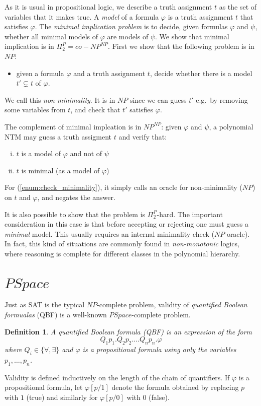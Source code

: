\documentclass{report}
\newcommand{\NP}{\text{$\mathit{NP}$}\xspace}
\newcommand{\Po}{\text{$\mathit{P}$}\xspace}
\newtheorem{definition}{Definition}[chapter]
\begin{document}
As it is usual in propositional logic, we describe a truth assignment $t$ as the set of variables that it makes true. A \emph{model} of a formula $\varphi$ is a truth assignment $t$ that satisfies $\varphi$. The \emph{minimal implication problem} is to decide, given formulas $\varphi$ and $\psi$, whether all minimal models of $\varphi$ are models of $\psi$. We show that minimal implication is in $\Pi_2^\Po = co-\NP^\NP$. First we show that the following problem is in $\NP$: 
\begin{itemize}
 \item given a formula $\varphi$ and a truth assignment $t$, decide whether there is a model $t' \subsetneq t$ of $\varphi$. 
\end{itemize}
We call this \emph{non-minimality}. It is in $\NP$ since we can guess $t'$ e.g.\ by removing some variables from $t$, and check that $t'$ satisfies $\varphi$. 

The complement of minimal implcation is in $\NP^\NP$: given $\varphi$ and $\psi$, a polynomial NTM may guess a truth assigment $t$ and verify that:
\begin{enumerate}[(i)]
 \item $t$ is a model of $\varphi$ and not of $\psi$
 \item $t$ is minimal (as a model of $\varphi$) \label{enum:check_minimality}
\end{enumerate}
For (\ref{enum:check_minimality}), it simply calls an oracle for non-minimality ($\NP$) on $t$ and $\varphi$, and negates the answer. 

It is also possible to show that the problem is $\Pi_2^\Po$-hard. The important consideration in this case is that before accepting or rejecting one must guess a \emph{minimal} model. This usually requires an internal minimality check ($\NP$-oracle). In fact, this kind of situations are commonly found in \emph{non-monotonic} logics, where reasoning is complete for different classes in the polynomial hierarchy. 

\section*{$PSpace$}
Just as SAT is the typical $\NP$-complete problem, validity of \emph{quantified Boolean formualas} (QBF) is a well-known $PSpace$-complete problem. 

\begin{definition} A quantified Boolean formula (QBF) is an expression of the form 
\[ Q_1p_1.Q_2p_2. \ldots Q_np_n.\varphi \]
where $Q_i \in \{\forall, \exists\}$ and $\varphi$ is a propositional formula using only the variables $p_1, \ldots, p_n$.   
\end{definition}
Validity is defined inductively on the length of the chain of quantifiers. If $\varphi$ is a propositional formula, let $\varphi[p/1]$ denote the formula obtained by replacing $p$ with $1$ (true) and similarly for $\varphi[p/0]$ with $0$ (false). 
\end{document}
